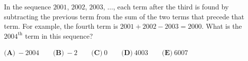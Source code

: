 In the sequence $2001$, $2002$, $2003$, $\ldots$, each term after the third is found by subtracting the previous term from the sum of the two terms that precede that term. For example, the fourth term is $2001+2002-2003=2000$. What is the $2004^\text{th}$ term in this sequence?

$\textbf{(A)}\ -2004 \qquad \textbf{(B)}\ -2 \qquad \textbf{(C)}\ 0 \qquad \textbf{(D)}\ 4003 \qquad \textbf{(E)}\ 6007$
